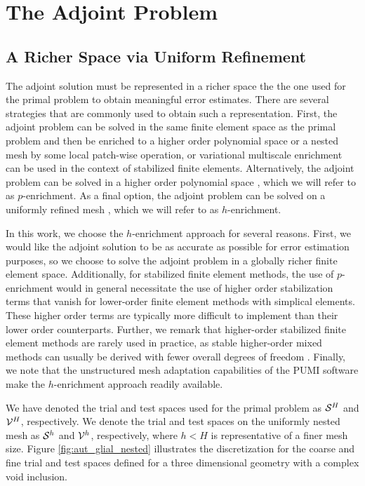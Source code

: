 \section{The Adjoint Problem}
\label{sec:aut_adjoint}

\subsection{A Richer Space via Uniform Refinement}

The adjoint solution must be represented in a richer
space the the one used for the primal problem to obtain meaningful error
estimates. There are several strategies that are commonly used to obtain
such a representation. First, the adjoint problem can be solved in the same
finite element space as the primal problem and then be enriched to a higher
order polynomial space \cite{becker2001optimal} or a nested mesh
\cite{nemec2007adjoint} by some local patch-wise operation, or variational
multiscale enrichment \cite{granzow2017output} can be used in the context
of stabilized finite elements. Alternatively, the adjoint problem can be solved in a
higher order polynomial space \cite{fidkowski2011output}, which we will refer
to as $p$-enrichment. As a final option, the adjoint problem can be solved on a
uniformly refined mesh \cite{burstedde2009parallel}, which we will refer to
as $h$-enrichment.

In this work, we choose the $h$-enrichment approach for several reasons.
First, we would like the adjoint solution to be as accurate as possible
for error estimation purposes, so we choose to solve the adjoint problem in
a globally richer finite element space. Additionally, for stabilized finite
element methods, the use of $p$-enrichment would in general necessitate the
use of higher order stabilization terms that vanish for lower-order finite
element methods with simplical elements. These higher order terms are
typically more difficult to implement than their lower order counterparts.
Further, we remark that higher-order stabilized finite element methods are
rarely used in practice, as stable higher-order mixed methods can usually
be derived with fewer overall degrees of freedom \cite{taylor1973numerical}.
Finally, we note that the unstructured mesh adaptation capabilities of the
PUMI software make the $h$-enrichment approach readily available.

We have denoted the trial and test spaces used for the primal problem
as $\S^H$ and $\V^H$, respectively. We denote the trial and test spaces on
the uniformly nested mesh as $\S^h$ and $\V^h$, respectively, where $h < H$
is representative of a finer mesh size. Figure \ref{fig:aut_glial_nested}
illustrates the discretization for the coarse and fine trial and test spaces
defined for a three dimensional geometry with a complex void inclusion.

